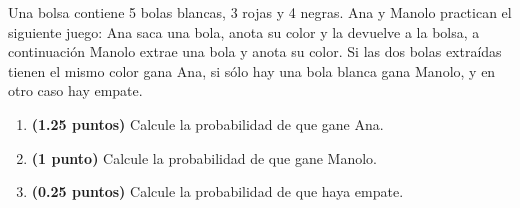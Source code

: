 
Una bolsa contiene 5 bolas blancas, 3 rojas y 4 negras. Ana y Manolo practican el siguiente juego: Ana saca una bola, anota su color y la devuelve a la bolsa, a continuación Manolo extrae una bola y anota su color. Si las dos bolas extraídas tienen el mismo color gana Ana, si sólo hay una bola blanca gana Manolo, y en otro caso hay empate.
\begin{enumerate}[label=\alph*)]
\item \textbf{(1.25 puntos)} Calcule la probabilidad de que gane Ana.
\item \textbf{(1 punto)} Calcule la probabilidad de que gane Manolo.
\item \textbf{(0.25 puntos)} Calcule la probabilidad de que haya empate.
\end{enumerate}
